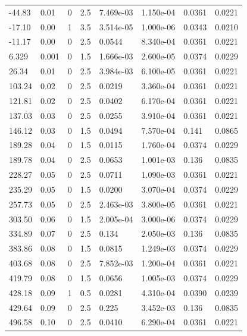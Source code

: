 \documentclass[preview]{standalone}
\begin{document}
{{\begin{tabular}{L{1.2cm}C{1.2cm} C{0.3cm}C{0.5cm} C{1.4cm}C{1.4cm} C{1.4cm}C{1.4cm}}
  -44.83  &  0.01  & 0     & 2.5 &  7.469e-03  & 1.150e-04  & 0.0361 &  0.0221   \\ 
  -17.10  &  0.00  & 1     & 3.5 &  3.514e-05  & 1.000e-06  & 0.0343 &  0.0210   \\ 
  -11.17  &  0.00  & 0     & 2.5 &  0.0544  & 8.340e-04  & 0.0361 &  0.0221   \\ 
  6.329  &  0.001  & 0     & 1.5 &  1.666e-03  & 2.600e-05  & 0.0374 &  0.0229   \\ 
  26.34  &  0.01  & 0     & 2.5 &  3.984e-03  & 6.100e-05  & 0.0361 &  0.0221   \\ 
  103.24  &  0.02  & 0     & 2.5 &  0.0219  & 3.360e-04  & 0.0361 &  0.0221   \\ 
  121.81  &  0.02  & 0     & 2.5 &  0.0402  & 6.170e-04  & 0.0361 &  0.0221   \\ 
  137.03  &  0.03  & 0     & 2.5 &  0.0255  & 3.910e-04  & 0.0361 &  0.0221   \\ 
  146.12  &  0.03  & 0     & 1.5 &  0.0494  & 7.570e-04  & 0.141 &  0.0865   \\ 
  189.28  &  0.04  & 0     & 1.5 &  0.0115  & 1.760e-04  & 0.0374 &  0.0229   \\ 
  189.78  &  0.04  & 0     & 2.5 &  0.0653  & 1.001e-03  & 0.136 &  0.0835   \\ 
  228.27  &  0.05  & 0     & 2.5 &  0.0711  & 1.090e-03  & 0.0361 &  0.0221   \\ 
  235.29  &  0.05  & 0     & 1.5 &  0.0200  & 3.070e-04  & 0.0374 &  0.0229   \\ 
  257.73  &  0.05  & 0     & 2.5 &  2.463e-03  & 3.800e-05  & 0.0361 &  0.0221   \\ 
  303.50  &  0.06  & 0     & 1.5 &  2.005e-04  & 3.000e-06  & 0.0374 &  0.0229   \\ 
  334.89  &  0.07  & 0     & 2.5 &  0.134  & 2.050e-03  & 0.136 &  0.0835   \\ 
  383.86  &  0.08  & 0     & 1.5 &  0.0815  & 1.249e-03  & 0.0374 &  0.0229   \\ 
  403.68  &  0.08  & 0     & 2.5 &  7.852e-03  & 1.200e-04  & 0.0361 &  0.0221   \\ 
  419.79  &  0.08  & 0     & 1.5 &  0.0656  & 1.005e-03  & 0.0374 &  0.0229   \\ 
  428.18  &  0.09  & 1     & 0.5 &  0.0281  & 4.310e-04  & 0.0390 &  0.0239   \\ 
  429.64  &  0.09  & 0     & 2.5 &  0.225  & 3.452e-03  & 0.136 &  0.0835   \\ 
  496.58  &  0.10  & 0     & 2.5 &  0.0410  & 6.290e-04  & 0.0361 &  0.0221   \\ 

\end{tabular}}}
\end{document}
